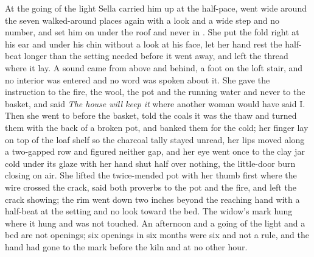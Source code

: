 \scenebreak

At the going of the light Sella carried him up at the half-pace, went wide around the seven walked-around places again with a look and a wide step and no number, and set him on  under the roof and never in . She put the fold right at his ear and under his chin without a look at his face, let her hand rest the half-beat longer than the setting needed before it went away, and left the thread where it lay. A sound came from above and behind, a foot on the loft stair, and no interior was entered and no word was spoken about it. She gave the instruction to the fire, the wool, the pot and the running water and never to the basket, and said \emph{The house will keep it} where another woman would have said I. Then she went to  before the basket, told the coals it was the thaw and turned them with the back of a broken pot, and banked them for the cold; her finger lay on top of the loaf shelf so the charcoal tally stayed unread, her lips moved along a two-gapped row and figured neither gap, and her eye went once to the clay jar cold under its glaze with her hand shut half over nothing, the little-door burn closing on air. She lifted the twice-mended pot with her thumb first where the wire crossed the crack, said both proverbs to the pot and the fire, and left the crack showing; the rim went down two inches beyond the reaching hand with a half-beat at the setting and no look toward the bed. The widow's mark hung where it hung and was not touched. An afternoon and a going of the light and a bed are not openings; six openings in six months were six and not a rule, and the hand had gone to the mark before the kiln and at no other hour.

